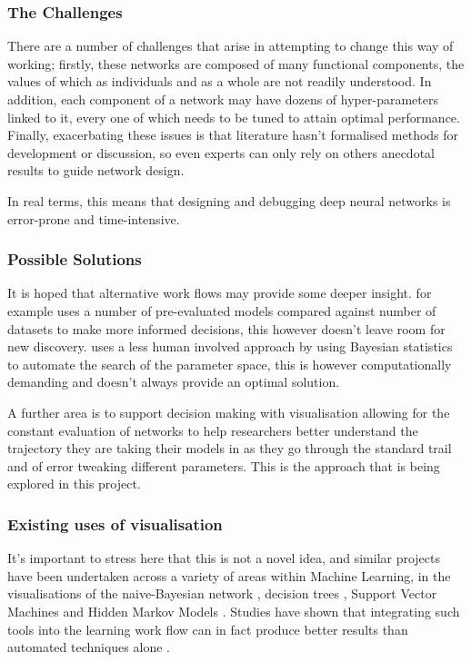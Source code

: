 \documentclass[a4paper,11pt,titlepage]{article}
\begin{document}
		\subsubsection{The Challenges}
		There are a number of challenges that arise in attempting to change this way of working; firstly, these networks are composed of many functional components, the values of which as individuals and as a whole are not readily understood. In addition, each component of a network may have dozens of hyper-parameters linked to it, every one of which needs to be tuned to attain optimal performance. Finally, exacerbating these issues is that literature hasn't formalised methods for development or discussion, so even experts can only rely on others anecdotal results to guide network design.
		\par 
		In real terms, this means that designing and debugging deep neural networks is error-prone and time-intensive. 
		\par 
		\subsubsection{Possible Solutions}
		It is hoped that alternative work flows may provide some deeper insight. \cite{Jarrett2009} for example uses a number of pre-evaluated models compared against number of datasets to make more informed decisions, this however doesn't leave room for new discovery. \cite{Bergstra2013} uses a less human involved approach by using Bayesian statistics to automate the search of the parameter space, this is however computationally demanding and doesn't always provide an optimal solution. 
		\par 
		A further area is to support decision making with visualisation allowing for the constant evaluation of networks to help researchers better understand the trajectory they are taking their models in as they go through the standard trail and of error tweaking different parameters. This is the approach that is being explored in this project. 
		\par
\subsubsection{Existing uses of visualisation}
	It's important to stress here that this is not a novel idea, and similar projects have been undertaken across a variety of areas within Machine Learning, in the visualisations of the naive-Bayesian network \cite{Becker2001}, decision trees \cite{Ankerst1999}, Support Vector Machines \cite{Caragea2001} and Hidden Markov Models \cite{Dai2008}. Studies have shown that integrating such tools into the learning work flow can in fact produce better results than automated techniques alone \cite{Ware2002}.
\end{document}

